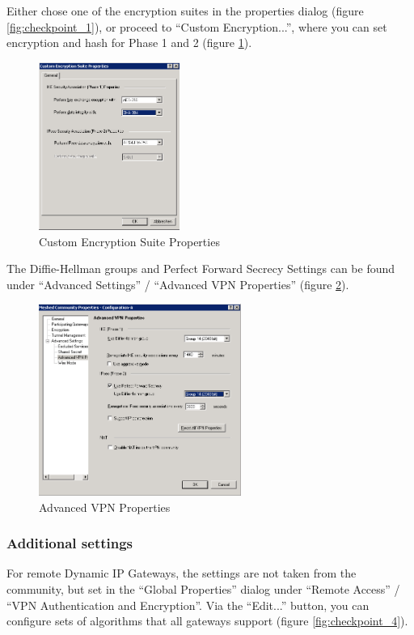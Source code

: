 Either chose one of the encryption suites in the properties dialog
(figure \ref{fig:checkpoint_1}), or proceed to
``Custom Encryption...'', where you can set encryption and hash for
Phase 1 and 2 (figure \ref{fig:checkpoint_2}).

\begin{figure}[p]
  \centering
  \includegraphics[width=0.411\textwidth]{img/checkpoint_2.png}
  \caption{Custom Encryption Suite Properties}
  \label{fig:checkpoint_2}
\end{figure}

The Diffie-Hellman groups and Perfect Forward Secrecy Settings can be
found under ``Advanced Settings'' / ``Advanced VPN Properties''
(figure \ref{fig:checkpoint_3}).

\begin{figure}[p]
  \centering
  \includegraphics[width=0.589\textwidth]{img/checkpoint_3.png}
  \caption{Advanced VPN Properties}
  \label{fig:checkpoint_3}
\end{figure}


\subsubsection{Additional settings}
For remote Dynamic IP Gateways, the settings are not taken from the
community, but set in the ``Global Properties'' dialog under ``Remote
Access'' / ``VPN Authentication and Encryption''. Via the ``Edit...''
button, you can configure sets of algorithms that all gateways support
(figure \ref{fig:checkpoint_4}).

